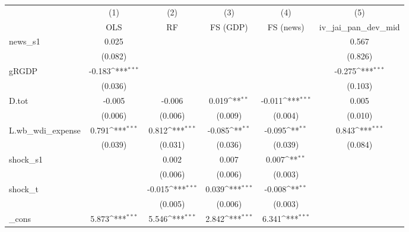 {
\def\sym#1{\ifmmode^{#1}\else\(^{#1}\)\fi}
\begin{tabular}{l*{5}{c}}
\toprule
            &\multicolumn{1}{c}{(1)}&\multicolumn{1}{c}{(2)}&\multicolumn{1}{c}{(3)}&\multicolumn{1}{c}{(4)}&\multicolumn{1}{c}{(5)}\\
            &\multicolumn{1}{c}{OLS}&\multicolumn{1}{c}{RF}&\multicolumn{1}{c}{FS (GDP)}&\multicolumn{1}{c}{FS (news)}&\multicolumn{1}{c}{iv\_jai\_pan\_dev\_mid}\\
\midrule
news\_s1     &       0.025         &                     &                     &                     &       0.567         \\
            &     (0.082)         &                     &                     &                     &     (0.826)         \\
\addlinespace
gRGDP       &      -0.183\sym{***}&                     &                     &                     &      -0.275\sym{***}\\
            &     (0.036)         &                     &                     &                     &     (0.103)         \\
\addlinespace
D.tot       &      -0.005         &      -0.006         &       0.019\sym{**} &      -0.011\sym{***}&       0.005         \\
            &     (0.006)         &     (0.006)         &     (0.009)         &     (0.004)         &     (0.010)         \\
\addlinespace
L.wb\_wdi\_expense&       0.791\sym{***}&       0.812\sym{***}&      -0.085\sym{**} &      -0.095\sym{**} &       0.843\sym{***}\\
            &     (0.039)         &     (0.031)         &     (0.036)         &     (0.039)         &     (0.084)         \\
\addlinespace
shock\_s1    &                     &       0.002         &       0.007         &       0.007\sym{**} &                     \\
            &                     &     (0.006)         &     (0.006)         &     (0.003)         &                     \\
\addlinespace
shock\_t     &                     &      -0.015\sym{***}&       0.039\sym{***}&      -0.008\sym{**} &                     \\
            &                     &     (0.005)         &     (0.006)         &     (0.003)         &                     \\
\addlinespace
\_cons      &       5.873\sym{***}&       5.546\sym{***}&       2.842\sym{***}&       6.341\sym{***}&                     \\

\end{tabular}}

